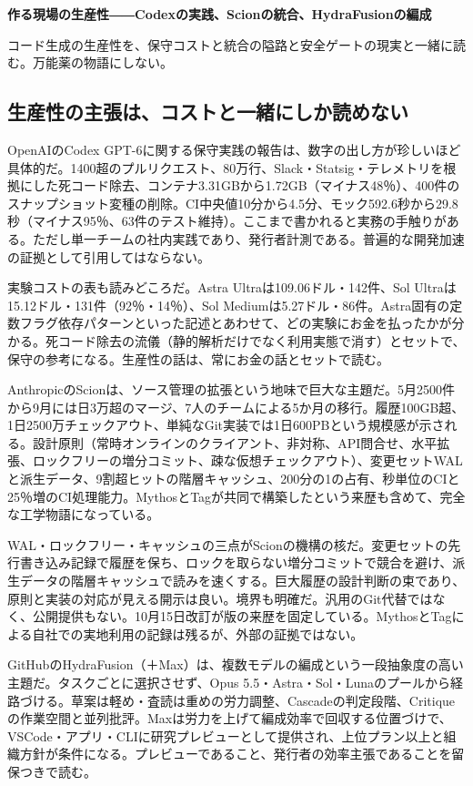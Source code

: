 \documentclass[lualatex,a4paper,10pt]{jlreq}
\begin{document}
{\Large\bfseries 作る現場の生産性――Codexの実践、Scionの統合、HydraFusionの編成\par}
\smallskip
{\color{SurveyMuted}コード生成の生産性を、保守コストと統合の隘路と安全ゲートの現実と一緒に読む。万能薬の物語にしない。\par}
\bigskip

\subsection*{生産性の主張は、コストと一緒にしか読めない}
OpenAIのCodex GPT-6に関する保守実践の報告は、数字の出し方が珍しいほど具体的だ。1400超のプルリクエスト、80万行、Slack・Statsig・テレメトリを根拠にした死コード除去、コンテナ3.31GBから1.72GB（マイナス48％）、400件のスナップショット変種の削除。CI中央値10分から4.5分、モック592.6秒から29.8秒（マイナス95％、63件のテスト維持）。ここまで書かれると実務の手触りがある。ただし単一チームの社内実践であり、発行者計測である。普遍的な開発加速の証拠として引用してはならない。

実験コストの表も読みどころだ。Astra Ultraは109.06ドル・142件、Sol Ultraは15.12ドル・131件（92％・14％）、Sol Mediumは5.27ドル・86件。Astra固有の定数フラグ依存パターンといった記述とあわせて、どの実験にお金を払ったかが分かる。死コード除去の流儀（静的解析だけでなく利用実態で消す）とセットで、保守の参考になる。生産性の話は、常にお金の話とセットで読む。

AnthropicのScionは、ソース管理の拡張という地味で巨大な主題だ。5月2500件から9月には日3万超のマージ、7人のチームによる5か月の移行。履歴100GB超、1日2500万チェックアウト、単純なGit実装では1日600PBという規模感が示される。設計原則（常時オンラインのクライアント、非対称、API問合せ、水平拡張、ロックフリーの増分コミット、疎な仮想チェックアウト）、変更セットWALと派生データ、9割超ヒットの階層キャッシュ、200分の1の占有、秒単位のCIと25％増のCI処理能力。MythosとTagが共同で構築したという来歴も含めて、完全な工学物語になっている。

WAL・ロックフリー・キャッシュの三点がScionの機構の核だ。変更セットの先行書き込み記録で履歴を保ち、ロックを取らない増分コミットで競合を避け、派生データの階層キャッシュで読みを速くする。巨大履歴の設計判断の束であり、原則と実装の対応が見える開示は良い。境界も明確だ。汎用のGit代替ではなく、公開提供もない。10月15日改訂が版の来歴を固定している。MythosとTagによる自社での実地利用の記録は残るが、外部の証拠ではない。

GitHubのHydraFusion（＋Max）は、複数モデルの編成という一段抽象度の高い主題だ。タスクごとに選択させず、Opus 5.5・Astra・Sol・Lunaのプールから経路づける。草案は軽め・査読は重めの労力調整、Cascadeの判定段階、Critiqueの作業空間と並列批評。Maxは労力を上げて編成効率で回収する位置づけで、VSCode・アプリ・CLIに研究プレビューとして提供され、上位プラン以上と組織方針が条件になる。プレビューであること、発行者の効率主張であることを留保つきで読む。
\end{document}
